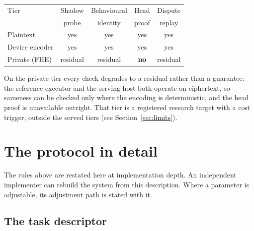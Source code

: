 \documentclass[11pt]{article}
\begin{document}
\begin{center}\small
    \begin{tabular}{lcccc}
        \toprule
        Tier           & Shadow   & Behavioural & Head        & Dispute  \\
                       & probe    & identity    & proof       & replay   \\
        \midrule
        Plaintext      & yes      & yes         & yes         & yes      \\
        Device encoder & yes      & yes         & yes         & yes      \\
        Private (FHE)  & residual & residual    & \textbf{no} & residual \\
        \bottomrule
    \end{tabular}
\end{center}

On the private tier every check degrades to a residual rather than
a guarantee: the reference executor and the serving host both
operate on ciphertext, so sameness can be checked only where the
encoding is deterministic, and the head proof is unavailable
outright. That tier is a registered research target with a cost
trigger, outside the served tiers (see
Section~\ref{sec:limits}).

\section{The protocol in detail}

The rules above are restated here at implementation depth. An
independent implementer can rebuild the system from this
description. Where a parameter is adjustable, its adjustment path
is stated with it.

\subsection{The task descriptor}
\end{document}
